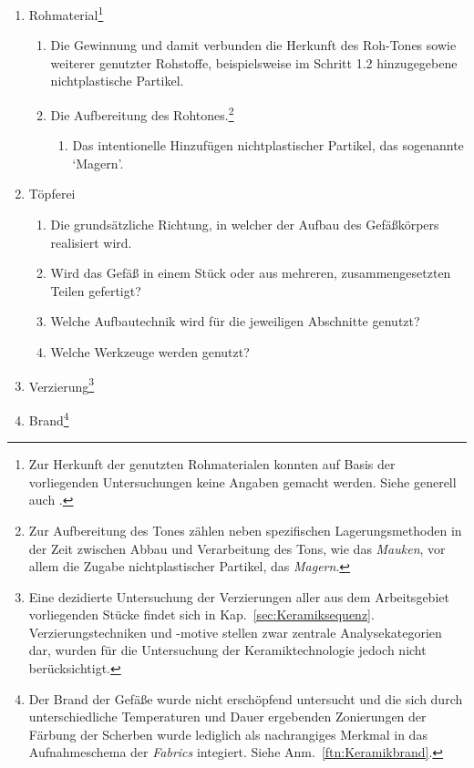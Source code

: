 \begin{multicols}{2}
\begin{enumerate}[label=\arabic*,ref=\arabic*]\setlength\itemsep{-0.25em}
	\item Rohmaterial\footnote{Zur Herkunft der genutzten Rohmaterialen konnten auf Basis der vorliegenden Untersuchungen keine Angaben gemacht werden. Siehe generell auch \textcites{Gosselain.2005}{Gosselain.2010b}.}
	\begin{enumerate}[label*=.\arabic*,ref=\theenumi.\arabic*]\setlength\itemsep{-0.25em}
		\item Die Gewinnung und damit verbunden die Herkunft des Roh-Tones sowie weiterer genutzter Rohstoffe, beispielsweise im Schritt 1.2 hinzugegebene nichtplastische Partikel.
		\item Die Aufbereitung des Rohtones.\footnote{Zur Aufbereitung des Tones zählen neben spezifischen Lagerungsmethoden in der Zeit zwischen Abbau und Verarbeitung des Tons, wie das \textit{Mauken}, vor allem die Zugabe nichtplastischer Partikel, das \textit{Magern}.}
		\begin{enumerate}[label*=.\arabic*,ref=\theenumi.\arabic*]\setlength\itemsep{-0.25em}
			\item Das intentionelle Hinzufügen nichtplastischer Partikel, das sogenannte \enquote*{Magern}.
		\end{enumerate}
	\end{enumerate}
	\item Töpferei
	\begin{enumerate}[label*=.\arabic*,ref=\theenumi.\arabic*]\setlength\itemsep{-0.25em}
		\item Die grundsätzliche Richtung, in welcher der Aufbau des Gefäßkörpers realisiert wird.%
		\item Wird das Gefäß in einem Stück oder aus mehreren, zusammengesetzten Teilen gefertigt?
		\item Welche Aufbautechnik wird für die jeweiligen Abschnitte genutzt?
		\item Welche Werkzeuge werden genutzt?
	\end{enumerate}
	\item Verzierung\footnote{Eine dezidierte Untersuchung der Verzierungen aller aus dem Arbeitsgebiet vorliegenden Stücke findet sich in Kap.~\ref{sec:Keramiksequenz}. Verzierungstechniken und -motive stellen zwar zentrale Analysekategorien dar, wurden für die Untersuchung der Keramiktechnologie jedoch nicht berücksichtigt.}
	\item Brand\footnote{Der Brand der Gefäße wurde nicht erschöpfend untersucht und die sich durch unterschiedliche Temperaturen und Dauer ergebenden Zonierungen der Färbung der Scherben wurde lediglich als nachrangiges Merkmal in das Aufnahmeschema der \textit{Fabrics} integiert. Siehe Anm.~\ref{ftn:Keramikbrand}.}
\end{enumerate}


\end{multicols}
